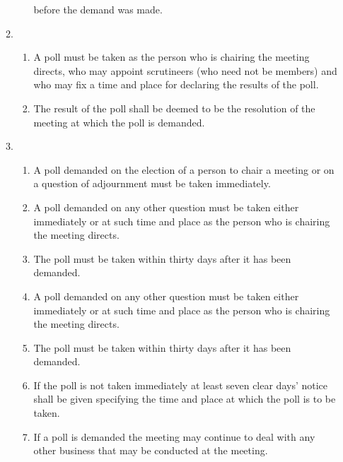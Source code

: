 \documentclass{article}
\begin{document}
\begin{enumerate}[label=\arabic*]
\begin{enumerate}[label=(\arabic*)]
\begin{enumerate}[label=(\alph*)]
            before the demand was made.
        \end{enumerate}
        \item \begin{enumerate}[label=(\alph*)]
            \item A poll must be taken as the person who is chairing the
            meeting directs, who may appoint scrutineers (who need
            not be members) and who may fix a time and place for
            declaring the results of the poll.
            \item The result of the poll shall be deemed to be the resolution
            of the meeting at which the poll is demanded.
        \end{enumerate}
        \item \begin{enumerate}[label=(\alph*)]
            \item A poll demanded on the election of a person to chair
            a meeting or on a question of adjournment must be
            taken immediately.
            \item A poll demanded on any other question must be taken
            either immediately or at such time and place as the
            person who is chairing the meeting directs.
            \item The poll must be taken within thirty days after it has
            been demanded.
            \item A poll demanded on any other question must be taken
            either immediately or at such time and place as the
            person who is chairing the meeting directs.
            \item The poll must be taken within thirty days after it has
            been demanded.
            \item If the poll is not taken immediately at least seven clear
            days' notice shall be given specifying the time and place
            at which the poll is to be taken.
            \item If a poll is demanded the meeting may continue to
            deal with any other business that may be conducted at
            the meeting.
        \end{enumerate}
    \end{enumerate}
    

\end{enumerate}
\end{document}
